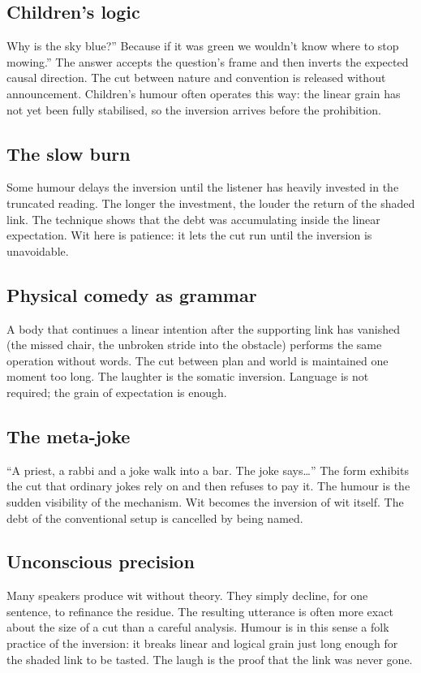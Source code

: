 \documentclass[11pt,a4paper]{article}
\begin{document}
\subsection{Children’s logic} Why is the sky blue?'' Because if it was green we wouldn’t know where to stop mowing.'' The answer accepts the question’s frame and then inverts the expected causal direction. The cut between nature and convention is released without announcement. Children’s humour often operates this way: the linear grain has not yet been fully stabilised, so the inversion arrives before the prohibition.

\subsection{The slow burn} Some humour delays the inversion until the listener has heavily invested in the truncated reading. The longer the investment, the louder the return of the shaded link. The technique shows that the debt was accumulating inside the linear expectation. Wit here is patience: it lets the cut run until the inversion is unavoidable.

\subsection{Physical comedy as grammar} A body that continues a linear intention after the supporting link has vanished (the missed chair, the unbroken stride into the obstacle) performs the same operation without words. The cut between plan and world is maintained one moment too long. The laughter is the somatic inversion. Language is not required; the grain of expectation is enough.

\subsection{The meta-joke} ``A priest, a rabbi and a joke walk into a bar. The joke says\ldots'' The form exhibits the cut that ordinary jokes rely on and then refuses to pay it. The humour is the sudden visibility of the mechanism. Wit becomes the inversion of wit itself. The debt of the conventional setup is cancelled by being named.

\subsection{Unconscious precision} Many speakers produce wit without theory. They simply decline, for one sentence, to refinance the residue. The resulting utterance is often more exact about the size of a cut than a careful analysis. Humour is in this sense a folk practice of the inversion: it breaks linear and logical grain just long enough for the shaded link to be tasted. The laugh is the proof that the link was never gone.
\end{document}
